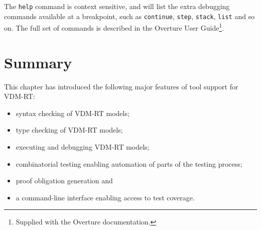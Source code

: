 The \verb|help| command is context sensitive, and will list the extra debugging
commands available at a breakpoint, such as \verb|continue|, \verb|step|,
\verb|stack|, \verb|list| and so on. The full set of commands is described in the
Overture User Guide\footnote{Supplied with the Overture documentation.}.

\lstset{style=mystyle}

\lstset{style=mystyle,language=VDM++}

\section{Summary}\label{sec:toolintrosummary}

This chapter has introduced the following major features of tool
support for VDM-RT:
\begin{itemize}
\item syntax checking of VDM-RT models;
\item type checking of VDM-RT models;
\item executing and debugging VDM-RT models;
\item combinatorial testing enabling automation of parts of the
  testing process; 
\item proof obligation generation and
\item a command-line interface enabling access to test coverage.
\end{itemize}
